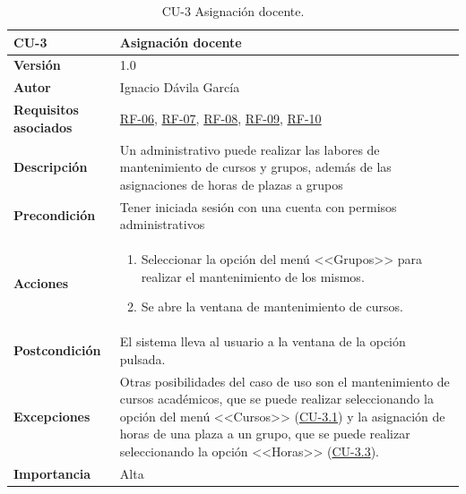 \begin{table}[p]
\label{table:CU-3}
	\centering
	\begin{tabularx}{\linewidth}{ p{} p{} }
		\toprule
		\textbf{CU-3}    & \textbf{Asignación docente}\\
		\toprule
		\textbf{Versión}              & 1.0    \\
		\textbf{Autor}                & Ignacio Dávila García \\
		\textbf{Requisitos asociados} & \hyperref[itm:RF6]{RF-06}, \hyperref[itm:RF7]{RF-07}, \hyperref[itm:RF8]{RF-08}, \hyperref[itm:RF9]{RF-09}, \hyperref[itm:RF10]{RF-10} \\
		\textbf{Descripción}          & Un administrativo puede realizar las labores de mantenimiento de cursos y grupos, además de las asignaciones de horas de plazas a grupos \\
		\textbf{Precondición}         & Tener iniciada sesión con una cuenta con permisos administrativos \\
		\textbf{Acciones}             &
		\begin{enumerate}
			\def\labelenumi{\arabic{enumi}.}
			\tightlist
			\item Seleccionar la opción del menú <<Grupos>> para realizar el mantenimiento de los mismos.
			\item Se abre la ventana de mantenimiento de cursos.
		\end{enumerate}\\
		\textbf{Postcondición}        & El sistema lleva al usuario a la ventana de la opción pulsada. \\
		\textbf{Excepciones}          & Otras posibilidades del caso de uso son el mantenimiento de cursos académicos, que se puede realizar seleccionando la opción del menú <<Cursos>> (\hyperref[table:CU-3.1]{CU-3.1}) y la asignación de horas de una plaza a un grupo, que se puede realizar seleccionando la opción <<Horas>> (\hyperref[table:CU-3.3]{CU-3.3}). \\
		\textbf{Importancia}          & Alta \\
		\bottomrule
	\end{tabularx}
	\caption{CU-3 Asignación docente.}
\end{table}
\FloatBarrier


